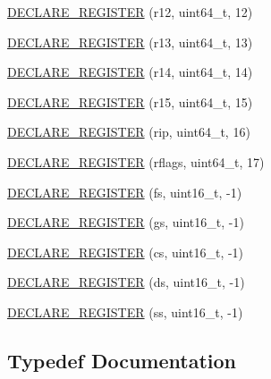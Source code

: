 \begin{DoxyCompactItemize}
\item 
\mbox{\hyperlink{namespacexd_1_1reg_1_1x86__64_a250e7d696de3f5e0cd29bf0052685d51}{D\+E\+C\+L\+A\+R\+E\+\_\+\+R\+E\+G\+I\+S\+T\+ER}} (r12, uint64\+\_\+t, 12)
\item 
\mbox{\hyperlink{namespacexd_1_1reg_1_1x86__64_a83ad61f894432e0ec31e51657942e58b}{D\+E\+C\+L\+A\+R\+E\+\_\+\+R\+E\+G\+I\+S\+T\+ER}} (r13, uint64\+\_\+t, 13)
\item 
\mbox{\hyperlink{namespacexd_1_1reg_1_1x86__64_aaaccfaa3350b04df32f3a837c8eb0a50}{D\+E\+C\+L\+A\+R\+E\+\_\+\+R\+E\+G\+I\+S\+T\+ER}} (r14, uint64\+\_\+t, 14)
\item 
\mbox{\hyperlink{namespacexd_1_1reg_1_1x86__64_a10c76133160224fded8718f7e8052414}{D\+E\+C\+L\+A\+R\+E\+\_\+\+R\+E\+G\+I\+S\+T\+ER}} (r15, uint64\+\_\+t, 15)
\item 
\mbox{\hyperlink{namespacexd_1_1reg_1_1x86__64_a59deeed10377a0f53f94fa8f3a1d2972}{D\+E\+C\+L\+A\+R\+E\+\_\+\+R\+E\+G\+I\+S\+T\+ER}} (rip, uint64\+\_\+t, 16)
\item 
\mbox{\hyperlink{namespacexd_1_1reg_1_1x86__64_ad3556ff87394c244af63709458dc9b41}{D\+E\+C\+L\+A\+R\+E\+\_\+\+R\+E\+G\+I\+S\+T\+ER}} (rflags, uint64\+\_\+t, 17)
\item 
\mbox{\hyperlink{namespacexd_1_1reg_1_1x86__64_a89df322151e44366c5c9639c19442a5a}{D\+E\+C\+L\+A\+R\+E\+\_\+\+R\+E\+G\+I\+S\+T\+ER}} (fs, uint16\+\_\+t, -\/1)
\item 
\mbox{\hyperlink{namespacexd_1_1reg_1_1x86__64_ab3e0321d77fef29ac516614a1c24327e}{D\+E\+C\+L\+A\+R\+E\+\_\+\+R\+E\+G\+I\+S\+T\+ER}} (gs, uint16\+\_\+t, -\/1)
\item 
\mbox{\hyperlink{namespacexd_1_1reg_1_1x86__64_a2d667c8c43deae153523019fc8d3042f}{D\+E\+C\+L\+A\+R\+E\+\_\+\+R\+E\+G\+I\+S\+T\+ER}} (cs, uint16\+\_\+t, -\/1)
\item 
\mbox{\hyperlink{namespacexd_1_1reg_1_1x86__64_a2d4090e6e3fb76b30cc65e40b0ecabe5}{D\+E\+C\+L\+A\+R\+E\+\_\+\+R\+E\+G\+I\+S\+T\+ER}} (ds, uint16\+\_\+t, -\/1)
\item 
\mbox{\hyperlink{namespacexd_1_1reg_1_1x86__64_a40d6d0ce08b8c19100c4d4dee5f76c72}{D\+E\+C\+L\+A\+R\+E\+\_\+\+R\+E\+G\+I\+S\+T\+ER}} (ss, uint16\+\_\+t, -\/1)
\end{DoxyCompactItemize}


\subsection{Typedef Documentation}
\mbox{\label{namespacexd_1_1reg_1_1x86__64_a3a7f77ab982b8a5833111da7ceccafeb}} 
